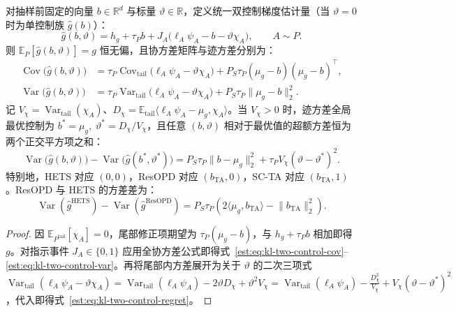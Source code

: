 \documentclass[lang=cn,scheme=chinese,openany]{elegantbook}
\newcommand{\E}{\mathbb E}
\newcommand{\Var}{\operatorname{Var}}
\newcommand{\tail}{\mathrm{tail}}
\newcommand{\R}{\mathbb R}
\begin{document}
\begin{theorem}
\label{est:thm:chapter3-resopd}
\label{est:thm:kl-two-controls}
对抽样前固定的向量 $b\in\R^d$ 与标量 $\vartheta\in\R$，定义统一双控制梯度估计量（当 $\vartheta=0$ 时为单控制族 $\widehat g(b)$）：
\begin{equation}
 \widehat g(b,\vartheta)
 =h_g+\tau_P b+J_A\bigl(\ell_A\psi_A-b-\vartheta \chi_A\bigr),\qquad A\sim P.
 \label{est:eq:chapter3-control-family}
\end{equation}
则 $\E_P[\widehat g(b,\vartheta)]=g$ 恒无偏，且协方差矩阵与迹方差分别为：
\begin{align}
 \operatorname{Cov}\bigl(\widehat g(b,\vartheta)\bigr)
 &=\tau_P\operatorname{Cov}_{\tail}\bigl(\ell_A\psi_A-\vartheta \chi_A\bigr)
   +P_S\tau_P(\mu_g-b)(\mu_g-b)^\top, \label{est:eq:kl-two-control-cov}\\
 \Var\bigl(\widehat g(b,\vartheta)\bigr)
 &=\tau_P\Var_{\tail}\bigl(\ell_A\psi_A-\vartheta \chi_A\bigr)
   +P_S\tau_P\lVert\mu_g-b\rVert_2^2.
 \label{est:eq:chapter3-control-var,est:eq:kl-two-control-var}
\end{align}
记 $V_\chi=\Var_{\tail}(\chi_A)$、$D_\chi=\E_{\tail}\langle \ell_A\psi_A-\mu_g,\chi_A\rangle$。当 $V_\chi>0$ 时，迹方差全局最优控制为 $b^*=\mu_g,\;\vartheta^*=D_\chi/V_\chi$，且任意 $(b,\vartheta)$ 相对于最优值的超额方差恒为两个正交平方项之和：
\begin{equation}
 \Var\bigl(\widehat g(b,\vartheta)\bigr)-\Var\bigl(\widehat g(b^*,\vartheta^*)\bigr)
 =P_S\tau_P\lVert b-\mu_g\rVert_2^2
  +\tau_P V_\chi(\vartheta-\vartheta^*)^2.
 \label{est:eq:kl-two-control-regret}
\end{equation}
特别地，HETS 对应 $(0,0)$，ResOPD 对应 $(b_{\mathrm{TA}},0)$，SC-TA 对应 $(b_{\mathrm{TA}},1)$。ResOPD 与 HETS 的方差差为：
\begin{equation}
 \Var(\widehat g^{\mathrm{HETS}})-\Var(\widehat g^{\mathrm{ResOPD}})
 =P_S\tau_P\left(2\langle\mu_g,b_{\mathrm{TA}}\rangle-\lVert b_{\mathrm{TA}}\rVert_2^2\right).
 \label{est:eq:chapter3-hets-resopd-gap}
\end{equation}
\end{theorem}
\begin{proof}
因 $\E_{P^\tail}[\chi_A]=0$，尾部修正项期望为 $\tau_P(\mu_g-b)$，与 $h_g+\tau_P b$ 相加即得 $g$。对指示事件 $J_A\in\{0,1\}$ 应用全协方差公式即得式~\eqref{est:eq:kl-two-control-cov}--\eqref{est:eq:kl-two-control-var}。再将尾部内方差展开为关于 $\vartheta$ 的二次三项式 $\Var_{\tail}(\ell_A\psi_A-\vartheta \chi_A)=\Var_{\tail}(\ell_A\psi_A)-2\vartheta D_\chi+\vartheta^2 V_\chi=\Var_{\tail}(\ell_A\psi_A)-\frac{D_\chi^2}{V_\chi}+V_\chi(\vartheta-\vartheta^*)^2$，代入即得式~\eqref{est:eq:kl-two-control-regret}。
\end{proof}
\end{document}
